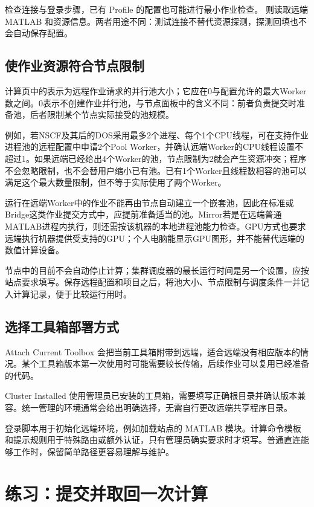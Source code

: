  检查连接与登录步骤，已有 Profile 的配置也可能进行最小作业检查。 则读取远端 MATLAB\regmark{} 和资源信息。两者用途不同：测试连接不替代资源探测，探测回填也不会自动保存配置。

\subsection{使作业资源符合节点限制}

计算页中的表示为远程作业请求的并行池大小；它应在0与配置允许的最大Worker数之间。0表示不创建作业并行池，与节点面板中的含义不同：前者负责提交时准备池，后者限制某个节点实际接受的池规模。

例如，若NSCF及其后的DOS采用最多2个进程、每个1个CPU线程，可在支持作业进程池的远程配置中申请2个Pool Worker，并确认远端Worker的CPU线程设置不超过1。如果远端已经给出4个Worker的池，节点限制为2就会产生资源冲突；程序不会忽略限制，也不会替用户缩小已有池。已有1个Worker且线程数相容的池可以满足这个最大数量限制，但不等于实际使用了两个Worker。

运行在远端Worker中的作业不能再由节点自动建立一个嵌套池，因此在标准或Bridge这类作业提交方式中，应提前准备适当的池。Mirror若是在远端普通MATLAB\regmark{}进程内执行，则还需按该机器的本地进程池能力检查。GPU方式也要求远端执行机器提供受支持的GPU；个人电脑能显示GPU图形，并不能替代远端的数值计算设备。

节点中的目前不会自动停止计算；集群调度器的最长运行时间是另一个设置，应按站点要求填写。保存远程配置和项目之后，将池大小、节点限制与调度条件一并记入计算记录，便于比较运行用时。


\subsection{选择工具箱部署方式}

Attach Current Toolbox 会把当前工具箱附带到远端，适合远端没有相应版本的情况。某个工具箱版本第一次使用时可能需要较长传输，后续作业可以复用已经准备的代码。

Cluster Installed 使用管理员已安装的工具箱，需要填写正确根目录并确认版本兼容。统一管理的环境通常会给出明确选择，无需自行更改远端共享程序目录。

登录脚本用于初始化远端环境，例如加载站点的 MATLAB\regmark{} 模块。计算命令模板和提示规则用于特殊路由或额外认证，只有管理员确实要求时才填写。普通直连能够工作时，保留简单路径更容易理解与维护。

\section{练习：提交并取回一次计算}

